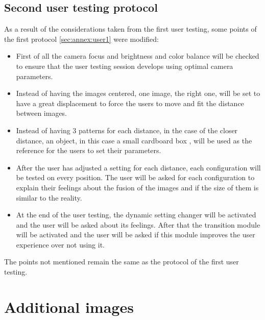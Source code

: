 \documentclass[10pt,a4paper,twocolumn,twoside]{article}
\begin{document}
	
	 
	\subsection{Second user testing protocol}
	\label{sec:annex:user2}
	
	As a result of the considerations taken from the first user testing, some points of the first protocol \ref{sec:annex:user1} were modified:
	\begin{itemize}
		\item First of all the camera focus and brightness and color balance will be checked to ensure that the user testing session develops using optimal camera parameters.
		
		\item Instead of having the images centered, one image, the right one, will be set to have a great displacement to force the users to move and fit the distance between images. 
		
		\item Instead of having 3 patterns for each distance, in the case of the closer distance, an object, in this case a small cardboard box , will be used as the reference for the users to set their parameters. 
		
		\item After the user has adjusted a setting for each distance, each configuration will be tested on every position. The user will be asked for each configuration to explain their feelings about the fusion of the images and if the size of them is similar to the reality. 
		
		\item At the end of the user testing, the dynamic setting changer will be activated and the user will be asked about its feelings. After that the transition module will be activated and the user will be asked if this module improves the user experience over not using it.  
	
	\end{itemize}

	The points not mentioned remain the same as the protocol of the first user testing.  
	
	\section{Additional images}
	
\end{document}

